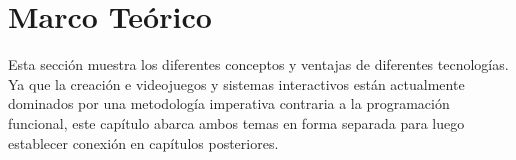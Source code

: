 \documentclass[letterpaper,12pt,times,oneside,numbered,print,index,custommargin,PageStyleI]{Classes/PhDThesisPSnPDF}
\begin{document}

\tableofcontents

\listoffigures

\listoftables



\printnomenclature

\mainmatter



\chapter{Marco Teórico}
\label{capitulo2}

Esta sección muestra los diferentes conceptos y ventajas de diferentes tecnologías. Ya que la creación e videojuegos y sistemas interactivos están actualmente dominados por una metodología imperativa contraria a la programación funcional, este capítulo abarca ambos temas en forma separada para luego establecer conexión en capítulos posteriores.









%
%
%
%
%
%
%



\end{document}
